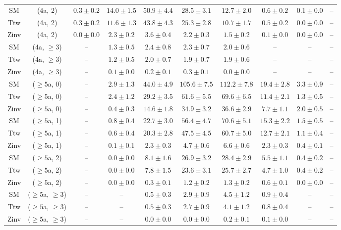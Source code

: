 \begin{table}[h!]
{\begin{tabular}{cccccccccc}
	SM & (4a, 2) & $0.3\pm 0.2$ & $14.0\pm 1.5$ & $50.9\pm 4.4$ & $28.5\pm 3.1$ & $12.7\pm 2.0$ & $0.6\pm 0.2$ & $0.1\pm 0.0$ & -- \\[0.5ex] 
	Ttw & (4a, 2) & $0.3\pm 0.2$ & $11.6\pm 1.3$ & $43.8\pm 4.3$ & $25.3\pm 2.8$ & $10.7\pm 1.7$ & $0.5\pm 0.2$ & $0.0\pm 0.0$ & -- \\[0.5ex] 
	Zinv & (4a, 2) & $0.0\pm 0.0$ & $2.3\pm 0.2$ & $3.6\pm 0.4$ & $2.2\pm 0.3$ & $1.5\pm 0.2$ & $0.1\pm 0.0$ & $0.0\pm 0.0$ & -- \\[0.5ex] 
	SM & (4a, $\ge3$) & -- & $1.3\pm 0.5$ & $2.4\pm 0.8$ & $2.3\pm 0.7$ & $2.0\pm 0.6$ & -- & -- & -- \\[0.5ex] 
	Ttw & (4a, $\ge3$) & -- & $1.2\pm 0.5$ & $2.0\pm 0.7$ & $1.9\pm 0.7$ & $1.9\pm 0.6$ & -- & -- & -- \\[0.5ex] 
	Zinv & (4a, $\ge3$) & -- & $0.1\pm 0.0$ & $0.2\pm 0.1$ & $0.3\pm 0.1$ & $0.0\pm 0.0$ & -- & -- & -- \\[0.5ex] 
	SM & ($\ge5$a, 0) & -- & $2.9\pm 1.3$ & $44.0\pm 4.9$ & $105.6\pm 7.5$ & $112.2\pm 7.8$ & $19.4\pm 2.8$ & $3.3\pm 0.9$ & -- \\[0.5ex] 
	Ttw & ($\ge5$a, 0) & -- & $2.4\pm 1.2$ & $29.2\pm 3.5$ & $61.6\pm 5.5$ & $69.6\pm 6.5$ & $11.4\pm 2.1$ & $1.3\pm 0.5$ & -- \\[0.5ex] 
	Zinv & ($\ge5$a, 0) & -- & $0.4\pm 0.3$ & $14.6\pm 1.8$ & $34.9\pm 3.2$ & $36.6\pm 2.9$ & $7.7\pm 1.1$ & $2.0\pm 0.5$ & -- \\[0.5ex] 
	SM & ($\ge5$a, 1) & -- & $0.8\pm 0.4$ & $22.7\pm 3.0$ & $56.4\pm 4.7$ & $70.6\pm 5.1$ & $15.3\pm 2.2$ & $1.5\pm 0.5$ & -- \\[0.5ex] 
	Ttw & ($\ge5$a, 1) & -- & $0.6\pm 0.4$ & $20.3\pm 2.8$ & $47.5\pm 4.5$ & $60.7\pm 5.0$ & $12.7\pm 2.1$ & $1.1\pm 0.4$ & -- \\[0.5ex] 
	Zinv & ($\ge5$a, 1) & -- & $0.1\pm 0.1$ & $2.3\pm 0.3$ & $4.7\pm 0.6$ & $6.6\pm 0.6$ & $2.3\pm 0.3$ & $0.4\pm 0.1$ & -- \\[0.5ex] 
	SM & ($\ge5$a, 2) & -- & $0.0\pm 0.0$ & $8.1\pm 1.6$ & $26.9\pm 3.2$ & $28.4\pm 2.9$ & $5.5\pm 1.1$ & $0.4\pm 0.2$ & -- \\[0.5ex] 
	Ttw & ($\ge5$a, 2) & -- & $0.0\pm 0.0$ & $7.8\pm 1.5$ & $23.6\pm 3.1$ & $25.7\pm 2.7$ & $4.7\pm 1.0$ & $0.4\pm 0.2$ & -- \\[0.5ex] 
	Zinv & ($\ge5$a, 2) & -- & $0.0\pm 0.0$ & $0.3\pm 0.1$ & $1.2\pm 0.2$ & $1.3\pm 0.2$ & $0.6\pm 0.1$ & $0.0\pm 0.0$ & -- \\[0.5ex] 
	SM & ($\ge5$a, $\ge3$) & -- & -- & $0.5\pm 0.3$ & $2.9\pm 0.9$ & $4.5\pm 1.2$ & $0.9\pm 0.4$ & -- & -- \\[0.5ex] 
	Ttw & ($\ge5$a, $\ge3$) & -- & -- & $0.5\pm 0.3$ & $2.7\pm 0.9$ & $4.1\pm 1.2$ & $0.8\pm 0.4$ & -- & -- \\[0.5ex] 
	Zinv & ($\ge5$a, $\ge3$) & -- & -- & $0.0\pm 0.0$ & $0.0\pm 0.0$ & $0.2\pm 0.1$ & $0.1\pm 0.0$ & -- & -- \\[0.5ex] 
	\hline
	\hline
\end{tabular}}
\end{table}
